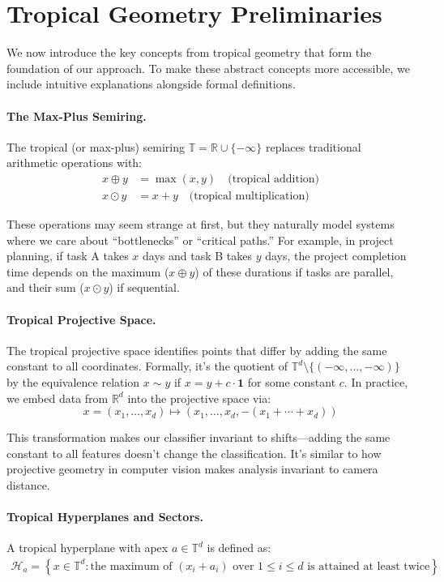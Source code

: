 \documentclass{article}
\newcommand{\R}{\mathbb{R}}
\newcommand{\trop}{\mathbb{T}}
\begin{document}
\section{Tropical Geometry Preliminaries}\label{sec:prelim}

We now introduce the key concepts from tropical geometry that form the foundation of our approach. To make these abstract concepts more accessible, we include intuitive explanations alongside formal definitions.

\paragraph{The Max-Plus Semiring.}
The tropical (or max-plus) semiring $\trop = \R \cup \{-\infty\}$ replaces traditional arithmetic operations with:
\begin{align}
x \oplus y &= \max(x,y) \quad \text{(tropical addition)} \\
x \odot y &= x + y \quad \text{(tropical multiplication)}
\end{align}

These operations may seem strange at first, but they naturally model systems where we care about ``bottlenecks'' or ``critical paths.'' For example, in project planning, if task A takes $x$ days and task B takes $y$ days, the project completion time depends on the maximum ($x \oplus y$) of these durations if tasks are parallel, and their sum ($x \odot y$) if sequential.

\paragraph{Tropical Projective Space.}  
The tropical projective space identifies points that differ by adding the same constant to all coordinates. Formally, it's the quotient of $\trop^d \setminus \{(-\infty,\dots,-\infty)\}$ by the equivalence relation $x \sim y$ if $x = y + c \cdot \mathbf{1}$ for some constant $c$. In practice, we embed data from $\R^d$ into the projective space via:
\[
x=(x_1,\dots,x_d)\mapsto (x_1,\dots,x_d,-(x_1+\cdots+x_d))
\]

This transformation makes our classifier invariant to shifts—adding the same constant to all features doesn't change the classification. It's similar to how projective geometry in computer vision makes analysis invariant to camera distance.

\paragraph{Tropical Hyperplanes and Sectors.}
A tropical hyperplane with apex $a \in \trop^d$ is defined as:
\begin{align}
\mathcal{H}_a = \left\{ x \in \trop^d : \text{the maximum of }(x_i + a_i)\text{ over $1\leq i\leq d$ is attained at least twice} \right\}
\end{align}
\end{document}
